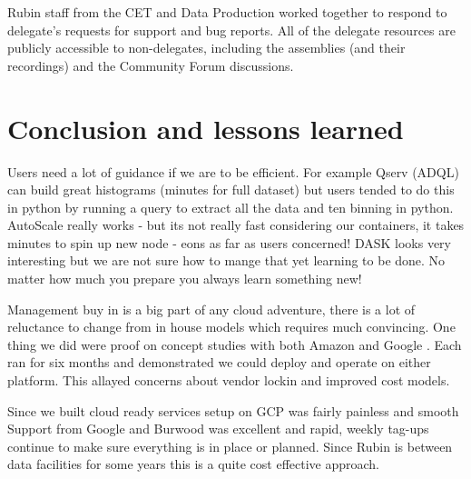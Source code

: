 Rubin staff from the CET and Data Production worked together to respond to delegate's requests for support and bug reports.
All of the delegate resources are publicly accessible to non-delegates, including the assemblies (and their recordings) and the Community Forum discussions.

\section{Conclusion and lessons learned}
Users need a lot of guidance if we are to be efficient.
For example Qserv (ADQL) can build great histograms (minutes for full dataset) but users
tended to do this in python by running a query to extract all the data and ten binning in python.
AutoScale really works - but its not really fast considering our containers, it takes minutes to spin up new node - eons as far as users concerned!
DASK looks very interesting but we are not sure how to mange that yet learning to be done.
No matter how much you prepare you always learn something new!

Management buy in is a big part of any cloud adventure, there is a  lot of reluctance to change from in house models
which requires much convincing. One thing we did were proof on concept studies with both Amazon \citep{DMTN-137} and Google \citep{DMTN-125}. Each ran for six months and demonstrated we could deploy and operate on either platform. This allayed concerns about vendor lockin and improved cost models.

Since we built cloud ready services setup on GCP was fairly painless and smooth
Support from Google and Burwood was excellent and rapid, weekly tag-ups continue to make sure everything is in place or planned.
Since Rubin is between data facilities for some years this is a quite cost effective approach.





